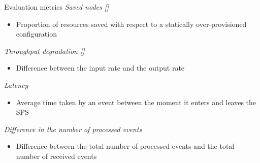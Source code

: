 \begin{frame}{Evaluation metrics}
	\textit{Saved nodes {\tiny [\cite{LombardiABQ18}]}}
        \begin{itemize}
            \item Proportion
of resources saved with respect to a statically over-provisioned configuration
		 \end{itemize}
	\textit{Throughput degradation {\tiny [\cite{LombardiABQ18}]}}
		 \begin{itemize}
            \item Difference between the input rate and the output rate
         \end{itemize}
	\textit{Latency}
		 \begin{itemize}
         	\item Average time taken by an event between the moment it enters and leaves the SPS
         \end{itemize}
	\textit{Difference in the number of processed events}
		 \begin{itemize}         
            \item Difference between the total number of processed events and the total number of received events
        \end{itemize}
\end{frame}

